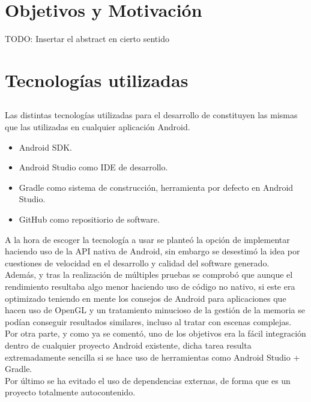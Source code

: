 
\section{Objetivos y Motivación}
TODO: Insertar el abstract en cierto sentido

\section{Tecnologías utilizadas}

\subsection{\robotto}

Las distintas tecnologías utilizadas para el desarrollo de \robotto constituyen las mismas que las utilizadas en cualquier aplicación Android.

\begin{itemize}
\item Android SDK.
\item Android Studio como IDE de desarrollo.
\item Gradle como sistema de construcción, herramienta por defecto en Android Studio.
\item GitHub como repositiorio de software.
\end{itemize}

A la hora de escoger la tecnología a usar se planteó la opción de implementar \robotto haciendo uso de la API nativa de Android, sin embargo se desestimó la idea por cuestiones de velocidad en el desarrollo y calidad del software generado.\\
Además, y tras la realización de múltiples pruebas se comprobó que aunque el rendimiento resultaba algo menor haciendo uso de código no nativo, si este era optimizado teniendo en mente los consejos de Android para aplicaciones que hacen uso de OpenGL y un tratamiento minucioso de la gestión de la memoria se podían conseguir resultados similares, incluso al tratar con escenas complejas.\\
Por otra parte, y como ya se comentó, uno de los objetivos era la fácil integración dentro de cualquier proyecto Android existente, dicha tarea resulta extremadamente sencilla si se hace uso de herramientas como Android Studio + Gradle.\\
Por último se ha evitado el uso de dependencias externas, de forma que \robotto es un proyecto totalmente autocontenido.\\

